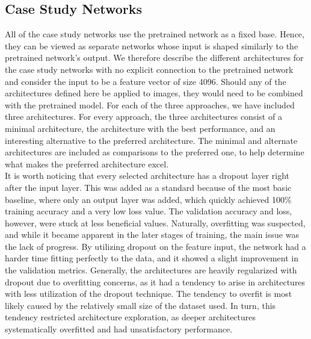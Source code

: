 


\subsection{Case Study Networks} \label{case-networks}


All of the case study networks use the pretrained network as a fixed base. Hence, they can be viewed as separate networks whose input is shaped similarly to the pretrained network's output. We therefore describe the different architectures for the case study networks with no explicit connection to the pretrained network and consider the input to be a feature vector of size 4096. Should any of the architectures defined here be applied to images, they would need to be combined with the pretrained model. For each of the three approaches, we have included three architectures. For every approach, the three architectures consist of a minimal architecture, the architecture with the best performance, and an interesting alternative to the preferred architecture. The minimal and alternate architectures are included as comparisons to the preferred one, to help determine what makes the preferred architecture excel. \\

\noindent It is worth noticing that every selected architecture has a dropout layer right after the input layer. This was added as a standard because of the most basic baseline, where only an output layer was added, which quickly achieved 100\% training accuracy and a very low loss value. The validation accuracy and loss, however, were stuck at less beneficial values. Naturally, overfitting was suspected, and while it became apparent in the later stages of training, the main issue was the lack of progress. By utilizing dropout on the feature input, the network had a harder time fitting perfectly to the data, and it showed a slight improvement in the validation metrics. Generally, the architectures are heavily regularized with dropout due to overfitting concerns, as it had a tendency to arise in architectures with less utilization of the dropout technique. The tendency to overfit is most likely caused by the relatively small size of the dataset used. In turn, this tendency restricted architecture exploration, as deeper architectures systematically overfitted and had unsatisfactory performance. \\

